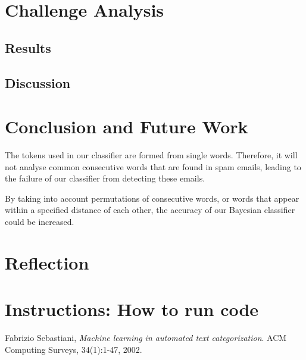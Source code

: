 \documentclass[10pt, a4paper]{article}
\begin{document}
\section{Challenge Analysis}


\subsection{Results}

\subsection{Discussion}

\section{Conclusion and Future Work}

The tokens used in our classifier are formed from single words. Therefore, it will not analyse common consecutive words that are found in spam emails, leading to the failure of our classifier from detecting these emails.

By taking into account permutations of consecutive words, or words that appear within a specified distance of each other, the accuracy of our Bayesian classifier could be increased.

\section{Reflection}

\section{Instructions: How to run code}

\begin{thebibliography}{9}

  Fabrizio Sebastiani,
  \emph{Machine learning in automated text categorization}.
  ACM Computing Surveys,
  34(1):1-47,
  2002.

\end{thebibliography}
\end{document}
